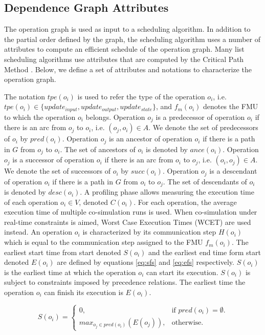 \subsection{Dependence Graph Attributes}

The operation graph is used as input to a scheduling algorithm. In addition to the partial order defined by the graph, the scheduling algorithm uses a number of attributes to compute an efficient schedule of the operation graph. Many list scheduling algorithms use attributes that are computed by the Critical Path Method \cite{kohler:1975}. Below, we define a set of attributes and notations to characterize the operation graph.

The notation $tpe(o_i)$ is used to refer the type of the operation $o_i$, i.e. $tpe(o_i) \in \{update_{input}, update_{output}, update_{state}\}$, and $f_m(o_i)$ denotes the FMU to which the operation $o_i$ belongs. Operation $o_j$ is a predecessor of operation $o_i$ if there is an arc from $o_j$ to $o_i$, i.e. $(o_j, o_i) \in A$. We denote the set of predecessors of $o_i$ by $pred(o_i)$. Operation $o_j$ is an ancestor of operation $o_i$ if there is a path in $G$ from $o_j$ to $o_i$. The set of ancestors of $o_i$ is denoted by $ance(o_i)$. Operation $o_j$ is a successor of operation $o_i$ if there is an arc from $o_i$ to $o_j$, i.e. $(o_i, o_j) \in A$. We denote the set of successors of $o_i$ by $succ(o_i)$. Operation $o_j$ is a descendant of operation $o_i$ if there is a path in $G$ from $o_i$ to $o_j$. The set of descendants of $o_i$ is denoted by $desc(o_i)$. A profiling phase allows measuring the execution time of each operation $o_i \in V$, denoted $C(o_i)$. For each operation, the average execution time of multiple co-simulation runs is used. When co-simulation under real-time constraints is aimed, Worst Case Execution Times (WCET) are used instead. An operation $o_i$ is characterized by its communication step $H(o_i)$ which is equal to the communication step assigned to the FMU $f_m(o_i)$. The earliest start time from start denoted $S(o_i)$ and the earliest end time form start denoted $E(o_i)$ are defined by equations \ref{eq:sfs} and \ref{eq:efs} respectively. $S(o_i)$ is the earliest time at which the operation $o_i$ can start its execution. $S(o_i)$ is subject to constraints imposed by precedence relations. The earliest time the operation $o_i$ can finish its execution is $E(o_i)$.

\begin{equation}
S(o_i)=\begin{cases}
    0, & \text{if $pred(o_i)=\emptyset$}.\\
    max_{o_j \in pred(o_i)}(E(o_j)), & \text{otherwise}.
  \end{cases}
	\label{eq:sfs}
\end{equation}

